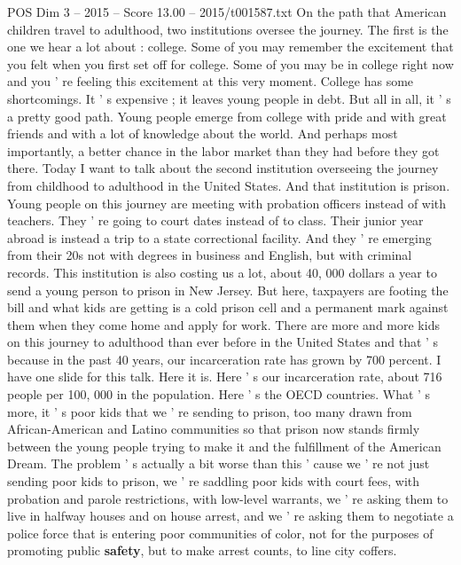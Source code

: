\begin{textsample}{POS Dim 3 – 2015 – Score 13.00 – 2015/t001587.txt}  \label{ex:f3_pos_034}
On the path that American children travel to adulthood, two institutions oversee the journey.
The first is the one we hear a lot about : college.
Some of you may remember the excitement that you felt when you first set off for college.
Some of you may be in college right now and you ' re feeling this excitement at this very moment.
College has some shortcomings.
It ' s expensive ; it leaves young people in debt.
But all in all, it ' s a pretty good path.
Young people emerge from college with pride and with great friends and with a lot of knowledge about the world.
And perhaps most importantly, a better chance in the labor market than they had before they got there.
Today I want to talk about the second institution overseeing the journey from childhood to adulthood in the United States.
And that institution is prison.
Young people on this journey are meeting with probation officers instead of with teachers.
They ' re going to court dates instead of to class.
Their junior year abroad is instead a trip to a state correctional facility.
And they ' re emerging from their 20s not with degrees in business and English, but with criminal records.
This institution is also costing us a lot, about 40, 000 dollars a year to send a young person to prison in New Jersey.
But here, taxpayers are footing the bill and what kids are getting is a cold prison cell and a permanent mark against them when they come home and apply for work.
There are more and more kids on this journey to adulthood than ever before in the United States and that ' s because in the past 40 years, our incarceration rate has grown by 700 percent.
I have one slide for this talk.
Here it is.
Here ' s our incarceration rate, about 716 people per 100, 000 in the population.
Here ' s the OECD countries.
What ' s more, it ' s poor kids that we ' re sending to prison, too many drawn from African-American and Latino communities so that prison now stands firmly between the young people trying to make it and the fulfillment of the American Dream.
The problem ' s actually a bit worse than this ' cause we ' re not just sending poor kids to prison, we ' re saddling poor kids with court fees, with probation and parole restrictions, with low-level warrants, we ' re asking them to live in halfway houses and on house arrest, and we ' re asking them to negotiate a police force that is entering poor communities of color, not for the purposes of promoting public \textbf{safety}, but to make arrest counts, to line city coffers.

\end{textsample}
